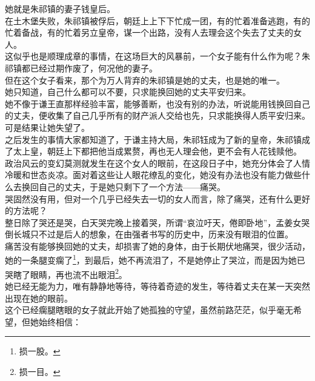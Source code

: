 \begin{multicols}{\theparacolNo}
她就是朱祁镇的妻子钱皇后。\\

在土木堡失败，朱祁镇被俘后，朝廷上上下下忙成一团，有的忙着准备逃跑，有的忙着备战，有的忙着另立皇帝，谋一个出路，没有人去理会这个失去了丈夫的女人。\\

这似乎也是顺理成章的事情，在这场巨大的风暴前，一个女子能有什么作为呢？朱祁镇都已经过期作废了，何况他的妻子。\\

但在这个女子看来，那个为万人背弃的朱祁镇是她的丈夫，也是她的唯一。\\

她只知道，自己什么都可以不要，只求能换回她的丈夫平安归来。\\

她不像于谦王直那样经验丰富，能够善断，也没有别的办法，听说能用钱换回自己的丈夫，便收集了自己几乎所有的财产派人交给也先，只求能换得人质平安归来。可是结果让她失望了。\\

之后发生的事情大家都知道了，于谦主持大局，朱祁钰成为了新的皇帝，朱祁镇成了太上皇，朝廷上下都把他当成累赘，再也无人理会他，更不会有人花钱赎他。\\

政治风云的变幻莫测就发生在这个女人的眼前，在这段日子中，她充分体会了人情冷暖和世态炎凉。面对着这些让人眼花缭乱的变化，她没有办法也没有能力做些什么去换回自己的丈夫，于是她只剩下了一个方法——痛哭。\\

哭固然没有用，但对一个几乎已经失去一切的女人而言，除了痛哭，还有什么更好的方法呢？\\

整日除了哭还是哭，白天哭完晚上接着哭，所谓“哀泣吁天，倦即卧地”，孟姜女哭倒长城只不过是后人的想象，在由强者书写的历史中，历来没有眼泪的位置。\\

痛苦没有能够换回她的丈夫，却损害了她的身体，由于长期伏地痛哭，很少活动，她的一条腿变瘸了\footnote{损一股。}，到最后，她不再流泪了，不是她停止了哭泣，而是因为她已哭瞎了眼睛，再也流不出眼泪\footnote{损一目。}。\\

她已经无能为力，唯有静静地等待，等待着奇迹的发生，等待着丈夫在某一天突然出现在她的眼前。\\

这个已经瘸腿瞎眼的女子就此开始了她孤独的守望，虽然前路茫茫，似乎毫无希望，但她始终相信：\\


\end{multicols}
